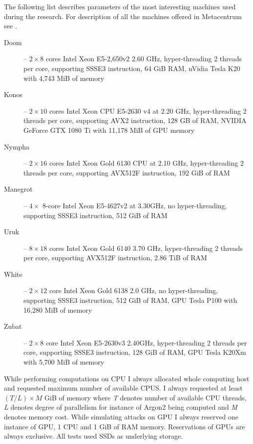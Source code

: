 \documentclass[nolof]{fithesis3}
\begin{document}
The following list describes parameters of the most interesting machines used during the research. For description of all the machines offered in Metacentrum see \parencite{metacentrumhw}.

\begin{description}
\item[Doom] -- $2 \times 8$ cores Intel Xeon E5-2,650v2 2.60 GHz, hyper-threading 2 threads per core, supporting SSSE3 instruction, 64 GiB RAM, nVidia Tesla K20 with 4,743 MiB of memory

\item[Konos] -- $2\times10$ cores Intel Xeon CPU E5-2630 v4 at 2.20 GHz, hyper-threading 2 threads per core, supporting AVX2 instruction, 128 GB of RAM, NVIDIA GeForce GTX 1080 Ti with 11,178 MiB of GPU memory

\item[Nympha] -- $2\times16$ cores Intel Xeon Gold 6130 CPU at 2.10 GHz, hyper-threading 2 threads per core, supporting AVX512F instruction, 192 GiB of RAM

\item[Manegrot] -- $4\times$ 8-core Intel Xeon E5-4627v2 at 3.30GHz, no hyper-threading, supporting SSSE3 instruction, 512 GiB of RAM

\item[Uruk] -- $8\times18$ cores Intel Xeon Gold 6140  3.70 GHz, hyper-threading 2 threads per core, supporting AVX512F instruction, 2.86 TiB of RAM

\item[White] -- $2\times12$ core Intel Xeon Gold 6138 2.0 GHz, no hyper-threading, supporting SSSE3 instruction, 512 GiB of RAM, GPU Tesla P100 with 16,280 MiB of memory

\item[Zubat] -- $2\times8$ core Intel Xeon E5-2630v3 2.40GHz, hyper-threading 2 threads per core, supporting SSSE3 instruction, 128 GiB of RAM, GPU Tesla K20Xm with 5,700 MiB of memory
\end{description}

While performing computations on CPU I always allocated whole computing host and requested maximum number of available CPUS. I always requested at least $(T/L) \times M$ GiB of memory where \emph{T} denotes number of available CPU threads, \emph{L} denotes degree of parallelism for instance of Argon2 being computed and \emph{M} denotes memory cost. While simulating attacks on GPU I always reserved one instance of GPU, 1 CPU and 1 GiB of RAM memory. Reservations of GPUs are always exclusive. All tests used SSDs as underlying storage.
\end{document}
